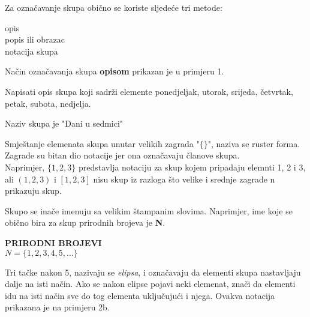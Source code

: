 \documentclass[a4paper, 14pt]{article}
\begin{document}
Za označavanje skupa obično se koriste sljedeće tri metode:
\begin{center}
opis\\
popis ili obrazac\\
notacija skupa
\end{center}
Način označavanja skupa \textbf{opisom} prikazan je u primjeru 1.

\begin{tcolorbox}[title=\large PRIMJER \hfill\small\textbf{"Opis skupova"}]
Napisati opis skupa koji sadrži elemente ponedjeljak, utorak, srijeda, četvrtak, petak, subota, nedjelja.
\begin{tcolorbox}
\begin{center}
Naziv skupa je "Dani u sedmici"
\end{center}
\end{tcolorbox}
\end{tcolorbox}

Smještanje elemenata skupa unutar velikih zagrada "$\{ \}$", naziva se ruster forma. Zagrade su bitan dio notacije jer ona označavaju članove skupa.\\
Naprimjer, $\{1, 2, 3\}$ predstavlja notaciju za skup kojem pripadaju elemnti 1, 2 i 3, ali $(1, 2, 3)$ i $[1, 2, 3]$ nisu skup iz razloga što velike i srednje zagrade n prikazuju skup.

Skupo se inače imenuju sa velikim štampanim slovima. Naprimjer, ime koje se obično bira za skup prirodnih brojeva je \textbf{N}.\\
\begin{tcolorbox}
\begin{center}
\textbf{\textsc{PRIRODNI BROJEVI}}\\
$N = \{1, 2, 3, 4, 5, ... \}$
\end{center}
\end{tcolorbox}
Tri tačke nakon 5, nazivaju se \textit{elipsa}, i označavaju da elementi skupa nastavljaju dalje na isti način. Ako se nakon elipse pojavi neki elemenat, znači da elementi idu na isti način sve do tog elementa uključujući i njega. Ovakva notacija prikazana je na primjeru 2b.
\end{document}
